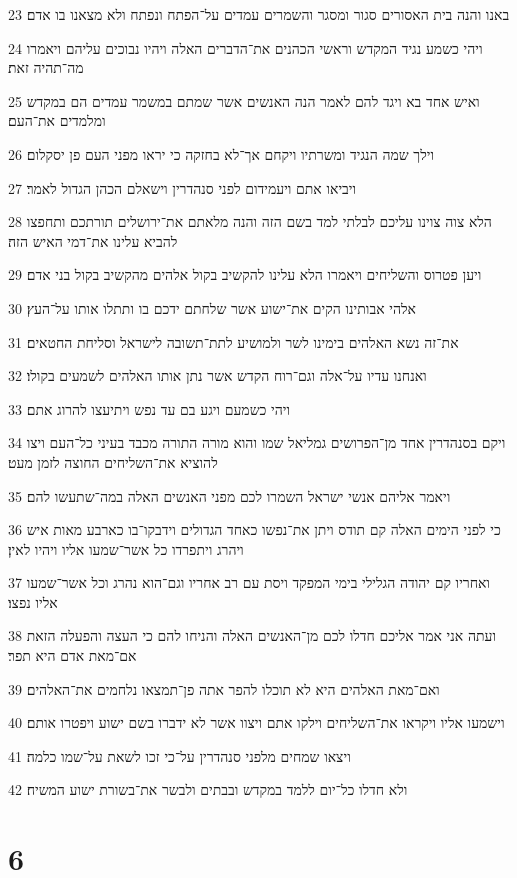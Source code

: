 \par 23 באנו והנה בית האסורים סגור ומסגר והשמרים עמדים על־הפתח ונפתח ולא מצאנו בו אדם׃
\par 24 ויהי כשמע נגיד המקדש וראשי הכהנים את־הדברים האלה ויהיו נבוכים עליהם ויאמרו מה־תהיה זאת׃
\par 25 ואיש אחד בא ויגד להם לאמר הנה האנשים אשר שמתם במשמר עמדים הם במקדש ומלמדים את־העם׃
\par 26 וילך שמה הנגיד ומשרתיו ויקחם אך־לא בחזקה כי יראו מפני העם פן יסקלום׃
\par 27 ויביאו אתם ויעמידום לפני סנהדרין וישאלם הכהן הגדול לאמר׃
\par 28 הלא צוה צוינו עליכם לבלתי למד בשם הזה והנה מלאתם את־ירושלים תורתכם ותחפצו להביא עלינו את־דמי האיש הזה׃
\par 29 ויען פטרוס והשליחים ויאמרו הלא עלינו להקשיב בקול אלהים מהקשיב בקול בני אדם׃
\par 30 אלהי אבותינו הקים את־ישוע אשר שלחתם ידכם בו ותתלו אותו על־העץ׃
\par 31 את־זה נשא האלהים בימינו לשר ולמושיע לתת־תשובה לישראל וסליחת החטאים׃
\par 32 ואנחנו עדיו על־אלה וגם־רוח הקדש אשר נתן אותו האלהים לשמעים בקולו׃
\par 33 ויהי כשמעם ויגע בם עד נפש ויתיעצו להרוג אתם׃
\par 34 ויקם בסנהדרין אחד מן־הפרושים גמליאל שמו והוא מורה התורה מכבד בעיני כל־העם ויצו להוציא את־השליחים החוצה לזמן מעט׃
\par 35 ויאמר אליהם אנשי ישראל השמרו לכם מפני האנשים האלה במה־שתעשו להם׃
\par 36 כי לפני הימים האלה קם תודס ויתן את־נפשו כאחד הגדולים וידבקו־בו כארבע מאות איש ויהרג ויתפרדו כל אשר־שמעו אליו ויהיו לאין׃
\par 37 ואחריו קם יהודה הגלילי בימי המפקד ויסת עם רב אחריו וגם־הוא נהרג וכל אשר־שמעו אליו נפצו׃
\par 38 ועתה אני אמר אליכם חדלו לכם מן־האנשים האלה והניחו להם כי העצה והפעלה הזאת אם־מאת אדם היא תפר׃
\par 39 ואם־מאת האלהים היא לא תוכלו להפר אתה פן־תמצאו נלחמים את־האלהים׃
\par 40 וישמעו אליו ויקראו את־השליחים וילקו אתם ויצוו אשר לא ידברו בשם ישוע ויפטרו אותם׃
\par 41 ויצאו שמחים מלפני סנהדרין על־כי זכו לשאת על־שמו כלמה׃
\par 42 ולא חדלו כל־יום ללמד במקדש ובבתים ולבשר את־בשורת ישוע המשיח׃

\chapter{6}

